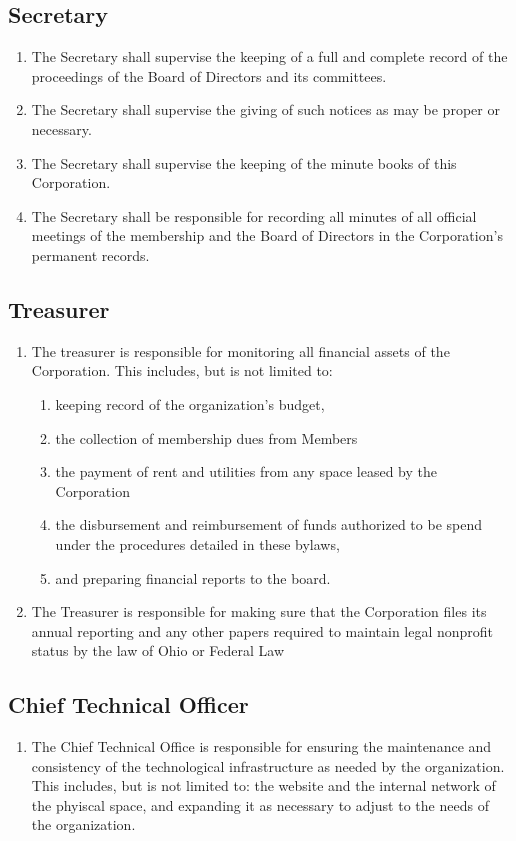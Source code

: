 \documentclass{article}
\begin{document}
\subsection{Secretary}
\begin{enumerate}
\item The Secretary shall supervise the keeping of a full and complete record of the 
proceedings of the Board of Directors and its committees.
\item The Secretary shall supervise the giving of such notices as may be proper or 
necessary.
\item The Secretary shall supervise the keeping of the minute books of this Corporation.
\item The Secretary shall be responsible for recording all minutes of all official meetings of 
the membership and the Board of Directors in the Corporation's permanent records.
\end{enumerate}
\subsection{Treasurer}
\begin{enumerate}
\item The treasurer is responsible for monitoring all financial assets of the Corporation.  
This includes, but is not limited to:
\begin{enumerate}
\item keeping record of the organization's budget,
\item the collection of membership dues from Members
\item the payment of rent and utilities from any space leased by the Corporation
\item the disbursement and reimbursement of funds authorized to be spend under the 
procedures detailed in these bylaws,
\item and preparing financial reports to the board.
\end{enumerate}
\item The Treasurer is responsible for making sure that the Corporation files its annual 
reporting and any other papers required to maintain legal nonprofit status by the law of 
Ohio or Federal Law
\end{enumerate}
\subsection{Chief Technical Officer}
\begin{enumerate}
\item The Chief Technical Office is responsible for ensuring the maintenance and 
consistency of the technological infrastructure as needed by the organization.  This 
includes, but is not limited to: the website and the internal network of the phyiscal space, and expanding it as necessary to adjust to the needs of the organization.
\end{enumerate}
\end{document}
